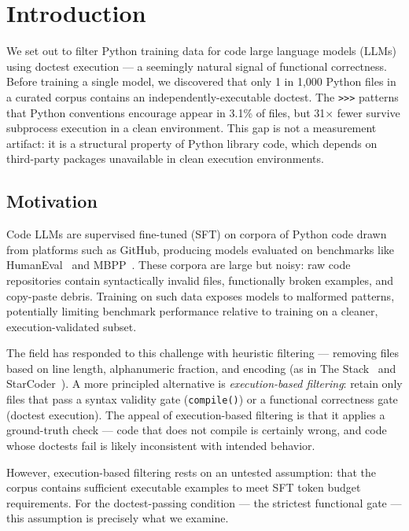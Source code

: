 \section{Introduction}

We set out to filter Python training data for code large language models (LLMs) using
doctest execution --- a seemingly natural signal of functional correctness. Before training
a single model, we discovered that only 1 in 1,000 Python files in a curated corpus
contains an independently-executable doctest. The \texttt{>>>} patterns that Python conventions
encourage appear in 3.1\% of files, but 31$\times$ fewer survive subprocess execution in a clean
environment. This gap is not a measurement artifact: it is a structural property of
Python library code, which depends on third-party packages unavailable in clean execution environments.

\subsection{Motivation}

Code LLMs are supervised fine-tuned (SFT) on corpora of Python code drawn from platforms
such as GitHub, producing models evaluated on benchmarks like HumanEval~\cite{Chen2021Evaluating}
and MBPP~\cite{Austin2021Program}. These corpora are large but noisy: raw code repositories
contain syntactically invalid files, functionally broken examples, and copy-paste debris.
Training on such data exposes models to malformed patterns, potentially limiting benchmark
performance relative to training on a cleaner, execution-validated subset.

The field has responded to this challenge with heuristic filtering --- removing files based
on line length, alphanumeric fraction, and encoding (as in The Stack~\cite{Kocetkov2022Stack}
and StarCoder~\cite{Li2023StarCoder}). A more principled alternative is \emph{execution-based
filtering}: retain only files that pass a syntax validity gate (\texttt{compile()}) or a
functional correctness gate (doctest execution). The appeal of execution-based filtering is
that it applies a ground-truth check --- code that does not compile is certainly wrong, and
code whose doctests fail is likely inconsistent with intended behavior.

However, execution-based filtering rests on an untested assumption: that the corpus contains
sufficient executable examples to meet SFT token budget requirements. For the doctest-passing
condition --- the strictest functional gate --- this assumption is precisely what we examine.

